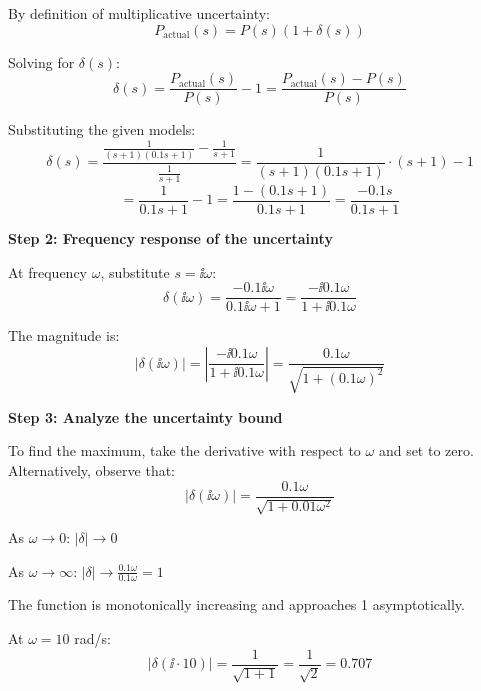 \documentclass[11pt,a4paper]{article}
\begin{document}
By definition of multiplicative uncertainty:
\begin{equation}
  P_{\text{actual}}(s) = P(s)(1 + \delta(s))
\end{equation}

Solving for $\delta(s)$:
\begin{equation}
  \delta(s) = \frac{P_{\text{actual}}(s)}{P(s)} - 1 = \frac{P_{\text{actual}}(s) - P(s)}{P(s)}
\end{equation}

Substituting the given models:
\begin{equation}
  \delta(s) = \frac{\frac{1}{(s+1)(0.1s+1)} - \frac{1}{s+1}}{\frac{1}{s+1}} = \frac{1}{(s+1)(0.1s+1)} \cdot (s+1) - 1
\end{equation}
\begin{equation}
  = \frac{1}{0.1s+1} - 1 = \frac{1 - (0.1s+1)}{0.1s+1} = \frac{-0.1s}{0.1s+1}
\end{equation}

\textbf{Step 2: Frequency response of the uncertainty}

At frequency $\omega$, substitute $s = \ii\omega$:
\begin{equation}
  \delta(\ii\omega) = \frac{-0.1\ii\omega}{0.1\ii\omega + 1} = \frac{-\ii 0.1\omega}{1 + \ii 0.1\omega}
\end{equation}

The magnitude is:
\begin{equation}
  |\delta(\ii\omega)| = \left|\frac{-\ii 0.1\omega}{1 + \ii 0.1\omega}\right| = \frac{0.1\omega}{\sqrt{1 + (0.1\omega)^2}}
\end{equation}

\textbf{Step 3: Analyze the uncertainty bound}

To find the maximum, take the derivative with respect to $\omega$ and set to zero. Alternatively, observe that:
\begin{equation}
  |\delta(\ii\omega)| = \frac{0.1\omega}{\sqrt{1 + 0.01\omega^2}}
\end{equation}

As $\omega \to 0$: $|\delta| \to 0$

As $\omega \to \infty$: $|\delta| \to \frac{0.1\omega}{0.1\omega} = 1$

The function is monotonically increasing and approaches 1 asymptotically.

At $\omega = 10$ rad/s:
\begin{equation}
  |\delta(\ii \cdot 10)| = \frac{1}{\sqrt{1 + 1}} = \frac{1}{\sqrt{2}} = 0.707
\end{equation}
\end{document}
